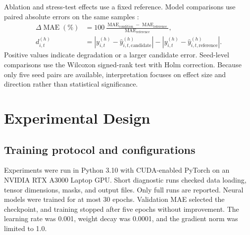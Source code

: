 \documentclass[smallcondensed]{svjour3}
\begin{document}
Ablation and stress-test effects use a fixed reference. Model comparisons use paired absolute errors on the same samples \cite{ref17,ref20,ref21}:
\begin{equation}
\begin{aligned}
\Delta\operatorname{MAE}(\%)
&=
100\,
\frac{\operatorname{MAE}_{\mathrm{condition}}-\operatorname{MAE}_{\mathrm{reference}}}
{\operatorname{MAE}_{\mathrm{reference}}},\\
d_{i,t}^{(h)}
&=
|y_{i,t}^{(h)}-\widehat{y}_{i,t,\mathrm{candidate}}^{(h)}|
-
|y_{i,t}^{(h)}-\widehat{y}_{i,t,\mathrm{reference}}^{(h)}|.
\end{aligned}
\label{eq:effects}
\end{equation}
Positive values indicate degradation or a larger candidate error. Seed-level comparisons use the Wilcoxon signed-rank test with Holm correction. Because only five seed pairs are available, interpretation focuses on effect size and direction rather than statistical significance.
\section{Experimental Design}
\subsection{Training protocol and configurations}
Experiments were run in Python 3.10 with CUDA-enabled PyTorch on an NVIDIA RTX A3000 Laptop GPU. Short diagnostic runs checked data loading, tensor dimensions, masks, and output files. Only full runs are reported. Neural models were trained for at most 30 epochs. Validation MAE selected the checkpoint, and training stopped after five epochs without improvement. The learning rate was 0.001, weight decay was 0.0001, and the gradient norm was limited to 1.0.
\end{document}

